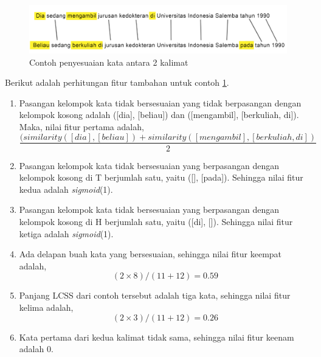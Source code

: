 	\begin{figure}
		\centering
		\includegraphics[width=0.9\linewidth]{pics/fitur_tambahan}
		\caption{Contoh penyesuaian kata antara 2 kalimat}
		\label{fig:fitur_tambahan}
	\end{figure}
	Berikut adalah perhitungan fitur tambahan untuk contoh \ref{fig:fitur_tambahan}.
	\begin{enumerate}
		\item Pasangan kelompok kata tidak bersesuaian yang tidak berpasangan dengan kelompok kosong adalah ([dia], [beliau]) dan ([mengambil], [berkuliah, di]). Maka, nilai fitur pertama adalah,
		\begin{equation}
		\frac{(similarity([dia], [beliau]) + similarity([mengambil], [berkuliah, di])}{2}
		\end{equation}
		\item Pasangan kelompok kata tidak bersesuaian yang berpasangan dengan kelompok kosong di T berjumlah satu, yaitu ([], [pada]). Sehingga nilai fitur kedua adalah \textit{sigmoid}(1).
		\item Pasangan kelompok kata tidak bersesuaian yang berpasangan dengan kelompok kosong di H berjumlah satu, yaitu ([di], []). Sehingga nilai fitur ketiga adalah \textit{sigmoid}(1).
		\item Ada delapan buah kata yang bersesuaian, sehingga nilai fitur keempat adalah,
		\begin{equation}
		(2 \times 8)/(11 + 12) = 0.59
		\end{equation}		
		\item Panjang LCSS dari contoh tersebut adalah tiga kata, sehingga nilai fitur kelima adalah,
		\begin{equation}
		(2 \times 3)/(11 + 12) = 0.26
		\end{equation}
		\item Kata pertama dari kedua kalimat tidak sama, sehingga nilai fitur keenam adalah 0.
	\end{enumerate}

